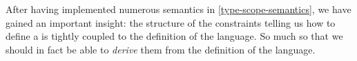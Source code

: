 After having implemented numerous semantics in \cref{type-scope-semantics},
we have gained an important insight: the structure of the constraints telling
us how to define a  is tightly coupled to the definition of the
language. So much so that we should in fact be able to \emph{derive} them
from the definition of the language.
